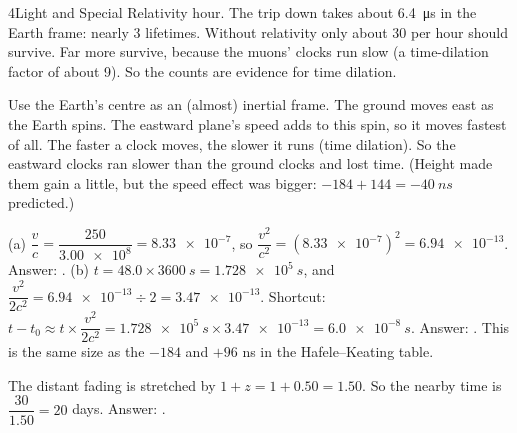\begin{chapteranswers}{4}{Light and Special Relativity}
        hour. The trip down
        takes about \qty{6.4}{\micro\second} in the Earth frame: nearly 3 lifetimes. Without
        relativity only about 30 per hour should survive. Far more survive, because the muons'
        clocks run slow (a time-dilation factor of about 9). So the counts are evidence for
        time dilation.
  \item Use the Earth's centre as an (almost) inertial frame. The ground moves east as the Earth
        spins. The eastward plane's speed adds to this spin, so it moves fastest of all. The
        faster a clock moves, the slower it runs (time dilation). So the eastward clocks ran
        slower than the ground clocks and lost time. (Height made them gain a little, but the
        speed effect was bigger: $-184 + 144 = \qty{-40}{ns}$ predicted.)
  \item (a) $\dfrac{v}{c} = \dfrac{250}{\num{3.00e8}} = \num{8.33e-7}$, so
        $\dfrac{v^2}{c^2} = (\num{8.33e-7})^2 = \num{6.94e-13}$. Answer: .
        (b) $t = 48.0 \times \qty{3600}{s} = \qty{1.728e5}{s}$, and
        $\dfrac{v^2}{2c^2} = \num{6.94e-13} \div 2 = \num{3.47e-13}$. Shortcut:
        $t - t_0 \approx t \times \dfrac{v^2}{2c^2} = \qty{1.728e5}{s} \times \num{3.47e-13}
        = \qty{6.0e-8}{s}$. Answer: . This is the same size as the
        $-184$ and $+96$ ns in the Hafele--Keating table.
  \item The distant fading is stretched by $1 + z = 1 + 0.50 = 1.50$. So the nearby time is
        $\dfrac{30}{1.50} = 20$ days. Answer: .
\end{chapteranswers}
